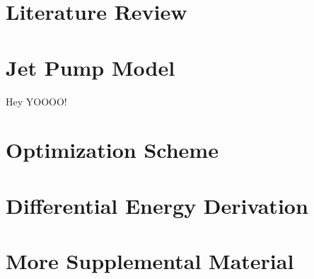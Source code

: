 \documentclass[12 pt]{report}
\begin{document}
\newpage



\chapter{Literature Review}

\chapter{Jet Pump Model}


Hey YOOOO! \cite{cunn_break}

\chapter{Optimization Scheme}




\appendix

\chapter{Differential Energy Derivation}


\chapter{More Supplemental Material}
\lipsum[7]

\printbibliography
\end{document}
